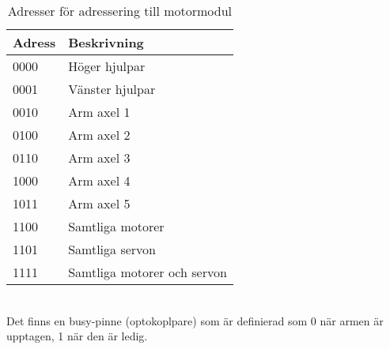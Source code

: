 \begin{table}[h]
	\centering
		\begin{tabularx}{\textwidth}{| l | X |}
			\hline
			\textbf{Adress} & \textbf{Beskrivning} \\
			\hline
			{0000} & {Höger hjulpar} \\
			\hline
			{0001} & {Vänster hjulpar} \\
			\hline
			{0010} & {Arm axel 1} \\ %
			\hline
			{0100} & {Arm axel 2} \\
			\hline
			{0110} & {Arm axel 3} \\
			\hline
			{1000} & {Arm axel 4} \\
			\hline
			{1011} & {Arm axel 5} \\ %
			\hline
			{1100} & {Samtliga motorer} \\
			\hline
			{1101} & {Samtliga servon} \\
			\hline
			{1111} & {Samtliga motorer och servon} \\
			\hline
		\end{tabularx}
	\caption{Adresser för adressering till motormodul} \label{protokoll:pc-motor-adress-tabell}
\end{table}
 \\


Det finns en busy-pinne (optokoplpare) som är definierad som 0 när armen är upptagen, 1 när den är ledig. 